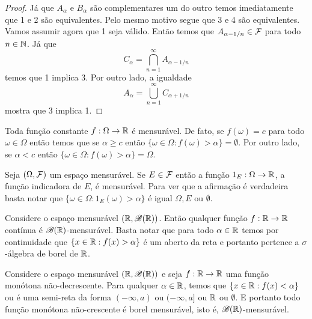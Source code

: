 \begin{proof}
	Já que $A_{\alpha}$ e $B_{\alpha}$ são complementares um do outro
	temos imediatamente que 1 e 2 são equivalentes. Pelo mesmo 
	motivo segue que 3 e 4 são equivalentes. Vamos assumir agora que 
	1 seja válido. Então temos que $A_{\alpha-1/n}\in \mathcal{F}$ para todo
	$n\in\mathbb{N}$. Já que 
	\[ 
		C_{\alpha} = \bigcap_{n=1}^{\infty} A_{\alpha-1/n} 
	\]
	temos que 1 implica 3. Por outro lado, a igualdade
	\[
		A_{\alpha} = \bigcup_{n=1}^{\infty} C_{\alpha+1/n}
	\]
	mostra que 3 implica 1.
\end{proof}



\begin{exemplo}\label{exemplo-func-const.mensuravel}
	Toda função constante $f:\Omega\to\mathbb{R}$ é mensurável.
	De fato, se $f(\omega)=c$ para todo $\omega\in\Omega$ 
	então temos que se $\alpha\geq c$ então 
	$\{\omega\in\Omega: f(\omega)>\alpha\} =\emptyset$.
	Por outro lado, se $\alpha<c$ então 
	$\{\omega\in\Omega: f(\omega)>\alpha\} =\Omega$.
\end{exemplo}





\begin{exemplo}
	Seja $(\Omega,\mathcal{F})$ um espaço mensurável. 
	Se $E\in\mathcal{F}$ então a função $1_E:\Omega\to\mathbb{R}$, a função indicadora de $E$,
	é mensurável.
	Para ver que a afirmação é verdadeira basta notar que 
	$\{\omega\in\Omega: 1_{E}(\omega)>\alpha \}$ é igual $\Omega, E$
	ou $\emptyset$.
\end{exemplo}



\begin{exemplo}
	Considere o espaço mensurável $(\mathbb{R},\mathscr{B}(\mathbb{R}))$. 
	Então qualquer função $f:\mathbb{R}\to\mathbb{R}$ contínua é 
	$\mathscr{B}(\mathbb{R})$-mensurável.
	Basta notar que para todo $\alpha\in \mathbb{R}$ temos
	por continuidade que $\{x\in\mathbb{R}: f(x)>\alpha\}$ é 
	um aberto da reta e portanto pertence a $\sigma$-álgebra
	de borel de $\mathbb{R}$.
\end{exemplo}




\begin{exemplo}
	Considere o espaço mensurável $(\mathbb{R},\mathscr{B}(\mathbb{R}))$ e 
	seja $f:\mathbb{R}\to\mathbb{R}$ uma função monótona não-decrescente.
	Para qualquer $\alpha\in\mathbb{R}$, 
	temos que $\{x\in\mathbb{R}: f(x)<\alpha\}$ ou é uma semi-reta
	da forma $(-\infty,a)$ ou $(-\infty,a]$ ou $\mathbb{R}$ ou $\emptyset$.
	E portanto todo função monótona não-crescente é borel 
	mensurável, isto é, $\mathscr{B}(\mathbb{R})$-mensurável.
\end{exemplo}



